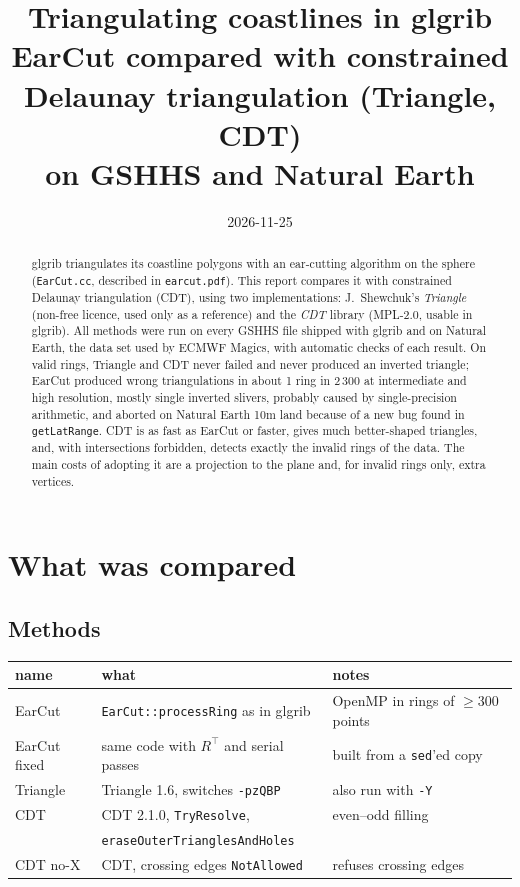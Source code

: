 \documentclass[11pt,a4paper]{article}
\title{Triangulating coastlines in glgrib\\[0.3em]
\large EarCut compared with constrained Delaunay triangulation (Triangle, CDT)\\
on GSHHS and Natural Earth}
\author{}
\date{2026-11-25}
\newcommand{\code}[1]{\texttt{#1}}
\begin{document}
\sloppy
\maketitle

\begin{abstract}
glgrib triangulates its coastline polygons with an ear-cutting algorithm on the sphere
(\code{EarCut.cc}, described in \code{earcut.pdf}). This report compares it with constrained
Delaunay triangulation (CDT), using two implementations: J.~Shewchuk's \emph{Triangle} (non-free
licence, used only as a reference) and the \emph{CDT} library (MPL-2.0, usable in glgrib).
All methods were run on every GSHHS file shipped with glgrib and on Natural Earth, the data set used
by ECMWF Magics, with automatic checks of each result.
On valid rings, Triangle and CDT never failed and never produced an inverted triangle; EarCut
produced wrong triangulations in about 1 ring in 2\,300 at intermediate and high resolution,
mostly single inverted slivers, probably caused by single-precision arithmetic, and aborted on Natural Earth
10m land because of a new bug found in \code{getLatRange}. CDT is as fast as EarCut or faster,
gives much better-shaped triangles, and, with intersections forbidden, detects exactly the
invalid rings of the data. The main costs of adopting it are a projection to the plane and, for
invalid rings only, extra vertices.
\end{abstract}

\tableofcontents

\section{What was compared}

\subsection{Methods}

\begin{center}\small
\begin{tabular}{lll}
\toprule
name & what & notes \\
\midrule
EarCut & \code{EarCut::processRing} as in glgrib & OpenMP in rings of $\geq 300$ points \\
EarCut fixed & same code with $R^\top$ and serial passes & built from a \code{sed}'ed copy \\
Triangle & Triangle 1.6, switches \code{-pzQBP} & also run with \code{-Y} \\
CDT & CDT 2.1.0, \code{TryResolve}, & even--odd filling \\
 & \code{eraseOuterTrianglesAndHoles} & \\
CDT no-X & CDT, crossing edges \code{NotAllowed} & refuses crossing edges \\
\bottomrule
\end{tabular}
\end{center}
\end{document}

